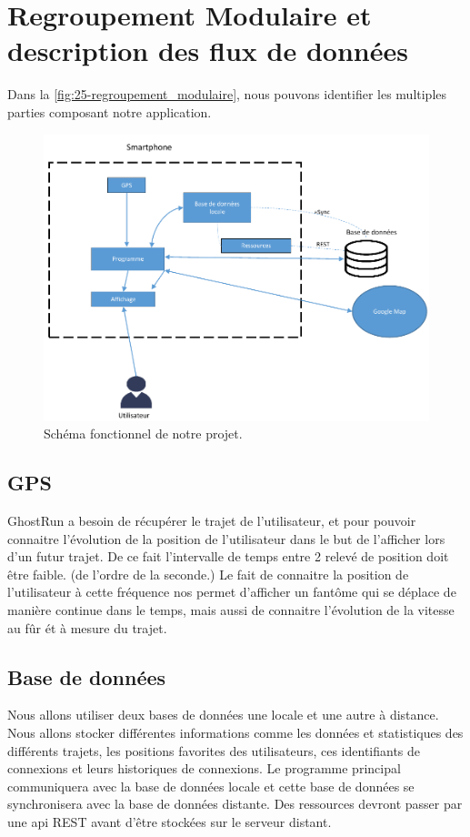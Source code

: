 \chapter{Regroupement Modulaire et description des flux de données}

Dans la \autoref{fig:25-regroupement_modulaire}, nous pouvons identifier les multiples parties composant notre application.

\begin{figure}[h]
    \centering
    \includegraphics[keepaspectratio, width=2\textwidth/2, height=2\textheight/5]{ima/regroupement_modulaire}
    \caption{Schéma fonctionnel de notre projet.}
    \label{fig:25-regroupement_modulaire}
\end{figure}

\section{GPS}
GhostRun a besoin de récupérer le trajet de l'utilisateur, et pour pouvoir connaitre l'évolution de la position de l'utilisateur
dans le but de l'afficher lors d'un futur trajet. De ce fait l'intervalle de temps entre 2 relevé de position doit être faible.
(de l'ordre de la seconde.)
Le fait de connaitre la position de l'utilisateur à cette fréquence nos permet d'afficher un fantôme qui se déplace de manière continue dans le temps,
mais aussi de connaitre l'évolution de la vitesse au fûr ét à mesure du trajet.

\section{Base de données}
Nous allons utiliser deux bases de données une locale et une autre à distance. Nous allons stocker différentes informations comme les données et statistiques des différents trajets, les positions favorites des utilisateurs, ces identifiants de connexions et leurs historiques de connexions.
Le programme principal communiquera avec la base de données locale et cette base de données se synchronisera avec la base de données distante. Des ressources devront passer par une api REST avant d’être stockées sur le serveur distant.



